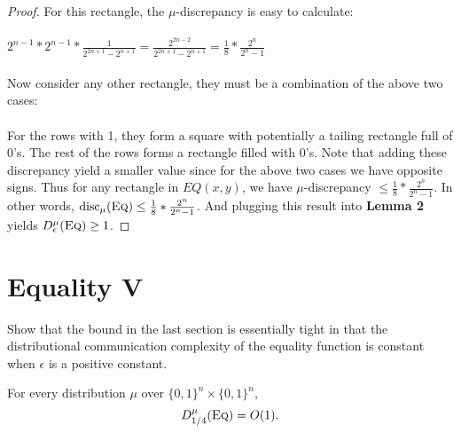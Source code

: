 \begin{proof}
	For this rectangle, the $\mu$-discrepancy is easy to calculate: \\
	\\
	$2^{n-1}*2^{n-1}*\frac{1}{2^{2n+1}-2^{n+1}} = \frac{2^{2n-2}}{2^{2n+1}-2^{n+1}} = \frac18*\frac{2^n}{2^n-1}$\\
	\\
	Now consider any other rectangle, they must be a combination of the above two cases:\\
	\\
	For the rows with 1, they form a square with potentially a tailing rectangle full of 0's. The rest of the rows forms a rectangle filled with 0's. Note that adding these discrepancy yield a smaller value since for the above two cases we have opposite signs. Thus for any rectangle in $EQ(x,y)$, we have $\mu$-discrepancy $\leq \frac18*\frac{2^n}{2^n-1}$. In other words, $\mathrm{disc}_\mu(\textsc{Eq}) \leq \frac18*\frac{2^n}{2^n-1}$. And plugging this result into \textbf{Lemma 2} yields $D^\mu_\epsilon(\textsc{Eq}) \ge 1$.
\end{proof}



\section{Equality V}

Show that the bound in the last section is essentially tight in that the distributional communication complexity of the equality function is constant when $\epsilon$ is a positive constant.

\begin{theorem}
	For every distribution $\mu$ over $\{0,1\}^n \times \{0,1\}^n$,
	\[
	D^\mu_{1/4}(\textsc{Eq}) = O(1).
	\]
\end{theorem}

